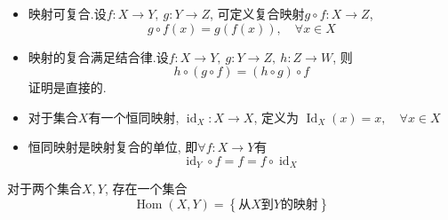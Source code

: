 \begin{itemize}
    \item 映射可复合.设$f\colon X\rightarrow Y,\ g \colon Y \rightarrow Z$, 可定义复合映射$g \circ f \colon X \rightarrow Z$,
    \begin{equation}
      g \circ f(x) = g\left( f(x) \right) , \quad \forall x\in X
    \end{equation}

    \item 映射的复合满足结合律.设$f\colon X\rightarrow Y,\ g\colon Y\rightarrow Z, \ h\colon Z\rightarrow W $, 则
    \begin{equation}
      h \circ \left( g\circ f \right) = (h \circ g) \circ f
    \end{equation}
    证明是直接的.

    \item 对于集合$X$有一个恒同映射, $\operatorname{id}_X \colon X \to X$, 定义为 $\operatorname{Id}_X(x) = x, \quad \forall x \in X$
    
    \item 恒同映射是映射复合的单位, 即$\forall f\colon X\rightarrow Y $有
    \begin{equation}
      \operatorname{id}_Y \circ f = f = f \circ \operatorname{id}_X
    \end{equation}
\end{itemize}


对于两个集合$X,Y$, 存在一个集合
\begin{equation}
  \operatorname{Hom}(X,Y) = \left\{ \text{从$X$到$Y$的映射} \right\} 
\end{equation}



